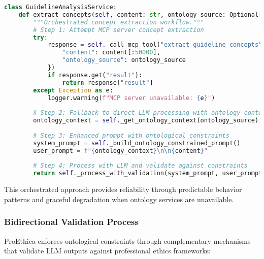 \begin{lstlisting}[language=Python, caption=Orchestrated Workflow Implementation]
class GuidelineAnalysisService:
    def extract_concepts(self, content: str, ontology_source: Optional[str] = None):
        """Orchestrated concept extraction workflow."""
        # Step 1: Attempt MCP server concept extraction
        try:
            response = self._call_mcp_tool("extract_guideline_concepts", {
                "content": content[:50000],
                "ontology_source": ontology_source
            })
            if response.get("result"):
                return response["result"]
        except Exception as e:
            logger.warning(f"MCP server unavailable: {e}")
        
        # Step 2: Fallback to direct LLM processing with ontology context
        ontology_context = self._get_ontology_context(ontology_source)
        
        # Step 3: Enhanced prompt with ontological constraints
        system_prompt = self._build_ontology_constrained_prompt()
        user_prompt = f"{ontology_context}\n\n{content}"
        
        # Step 4: Process with LLM and validate against constraints
        return self._process_with_validation(system_prompt, user_prompt)
\end{lstlisting}

This orchestrated approach provides reliability through predictable behavior patterns and graceful degradation when ontology services are unavailable.

\subsubsection{Bidirectional Validation Process}

ProEthica enforces ontological constraints through complementary mechanisms that validate LLM outputs against professional ethics frameworks:

